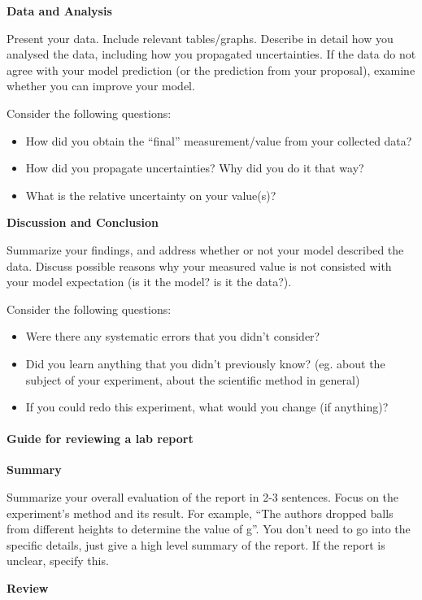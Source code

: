 \textbf{Data and Analysis}

Present your data. Include relevant tables/graphs. Describe in detail how you analysed the data, including how you propagated uncertainties. If the data do not agree with your model prediction (or the prediction from your proposal), examine whether you can improve your model.

Consider the following questions:

\begin{itemize}
\item How did you obtain the ``final'' measurement/value from your collected data?
\item How did you propagate uncertainties? Why did you do it that way?
\item What is the relative uncertainty on your value(s)?
\end{itemize}

\textbf{Discussion and Conclusion}

Summarize your findings, and address whether or not your model described the data. Discuss possible reasons why your measured value is not consisted with your model expectation (is it the model? is it the data?).

Consider the following questions:

\begin{itemize}
\item Were there any systematic errors that you didn't consider?
\item Did you learn anything that you didn't previously know? (eg. about the subject of your experiment, about the scientific method in general)
\item If you could redo this experiment, what would you change (if anything)?
\end{itemize}

\paragraph{Guide for reviewing a lab report}

\textbf{Summary}

Summarize your overall evaluation of the report in 2-3 sentences. Focus on the experiment's method and its result. For example, ``The authors dropped balls from different heights to determine the value of g''. You don't need to go into the specific details, just give a high level summary of the report. If the report is unclear, specify this.

\textbf{Review}

